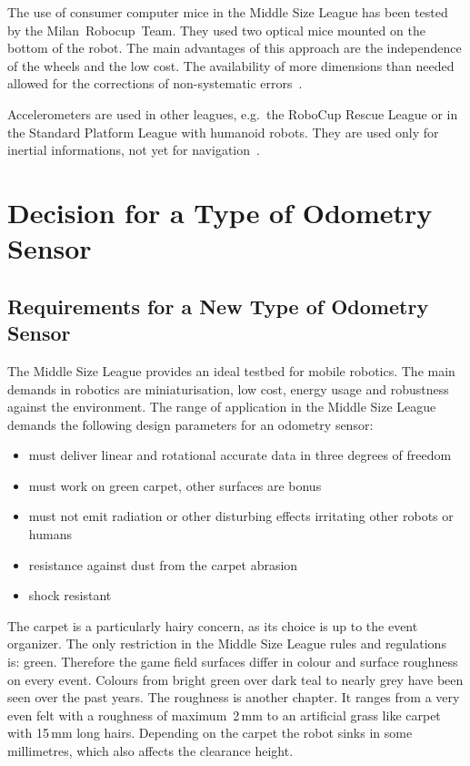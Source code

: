 \documentclass[12pt,a4paper]{article}
\newcommand{\MSL}{Middle Size League\xspace}
\begin{document}
The use of consumer computer mice in the \MSL has been tested by the Milan~Robocup~Team.
They used two optical mice mounted on the bottom of the robot.
The main advantages of this approach are the independence of the wheels and the low cost.
The availability of more dimensions than needed allowed for the corrections of non-systematic errors~\cite{two_mice}.

Accelerometers are used in other leagues, e.g.\ the RoboCup Rescue League or in the Standard Platform League with humanoid robots.
They are used only for inertial informations, not yet for navigation~\cite{zadeat}.

\clearpage
\section{Decision for a Type of Odometry Sensor}
\label{decision}


\subsection{Requirements for a New Type of Odometry Sensor}

The \MSL provides an ideal testbed for mobile robotics.
The main demands in robotics are miniaturisation, low cost, energy usage and robustness against the environment.
The range of application in the \MSL demands the following design parameters for an odometry sensor: %
\begin{itemize}
  \item must deliver linear and rotational accurate data in three degrees of freedom
  \item must work on green carpet, other surfaces are bonus
  \item must not emit radiation or other disturbing effects irritating other robots or humans
  \item resistance against dust from the carpet abrasion
  \item shock resistant
\end{itemize}

The carpet is a particularly hairy concern, as its choice is up to the event organizer.
The only restriction in the \MSL rules and regulations~\cite{msl-rules} is: green.
Therefore the game field surfaces differ in colour and surface roughness on every event.
Colours from bright green over dark teal to nearly grey have been seen over the past years.
The roughness is another chapter.
It ranges from a very even felt with a roughness of maximum~2\,mm to an artificial grass like carpet with 15\,mm long hairs. 
Depending on the carpet the robot sinks in some millimetres, which also affects the clearance height.
\end{document}
